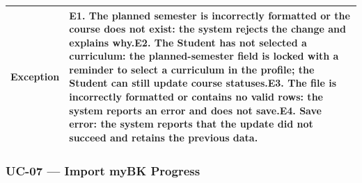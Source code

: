 \begin{longtable}{|p{}|p{}|}
\hline
\textbf{Exception} & E1. The planned semester is incorrectly formatted or the course does not exist: the system rejects the change and explains why.\newline E2. The Student has not selected a curriculum: the planned-semester field is locked with a reminder to select a curriculum in the profile; the Student can still update course statuses.\newline E3. The file is incorrectly formatted or contains no valid rows: the system reports an error and does not save.\newline E4. Save error: the system reports that the update did not succeed and retains the previous data. \\
\hline
\end{longtable}

\subsubsection{UC-07 --- Import myBK Progress}

